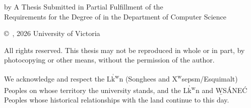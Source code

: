 \pagebreak
{
	\centering
	\thesistitle
	\tpbreak
	by
	\tpbreak
	\nameanddegrees
	\tpbreak
	A Thesis Submitted in Partial Fulfillment of the \\
	Requirements for the Degree of
	\tpbreak
	\PhDorMaster
	\tpbreak
	in the Department of Computer Science\\
	\vfill
	\begin{center}
		\copyright\ \yourname, 2026 \linebreak
		\phantom{\copyright} University of Victoria
	\end{center}

	\begin{center}
	All rights reserved. This thesis may not be reproduced in whole or in part, by \\
	photocopying or other means, without the permission of the author. 
	\end{center}

	\begin{center}
	{We acknowledge and respect the L\textschwa $\stackrel{\textrm{,}}{\textrm{k}}$\textsuperscript{w}\textschwa \textipa{\ng}\textschwa n (Songhees and X\textsuperscript{w}seps\textschwa m/Esquimalt) Peoples on whose territory the university stands, and the L\textschwa $\stackrel{\textrm{,}}{\textrm{k}}$\textsuperscript{w}\textschwa \textipa{\ng}\textschwa n and \b WS\'ANE\'C Peoples whose historical relationships with the land continue to this day.}
	\end{center}
}
\pagebreak
